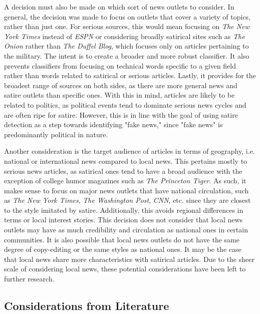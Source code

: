 \documentclass [12 pt] {report}
\begin{document}
A decision must also be made on which sort of news outlets to consider. In general, the decision was made to focus on outlets that cover a variety of topics, rather than just one. For serious sources, this would mean focusing on \textit{The New York Times} instead of \textit{ESPN} or considering broadly satirical sites such as \textit{The Onion} rather than \textit{The Duffel Blog}, which focuses only on articles pertaining to the military. The intent is to create a broader and more robust classifier. It also prevents classifiers from focusing on technical words specific to a given field rather than words related to satirical or serious articles. Lastly, it provides for the broadest range of sources on both sides, as there are more general news and satire outlets than specific ones. With this in mind, articles are likely to be related to politics, as political events tend to dominate serious news cycles and are often ripe for satire. However, this is in line with the goal of using satire detection as a step towards identifying "fake news," since "fake news" is predominantly political in nature.


Another consideration is the target audience of articles in terms of geography, i.e. national or international news compared to local news. This pertains mostly to serious news articles, as satirical ones tend to have a broad audience with the exception of college humor magazines such as \textit{The Princeton Tiger}. As such, it makes sense to focus on major news outlets that have national circulation, such as \textit{The New York Times}, \textit{The Washington Post}, \textit{CNN}, etc. since they are closest to the style imitated by satire. Additionally, this avoids regional differences in terms or local interest stories. This decision does not consider that local news outlets may have as much credibility and circulation as national ones in certain communities. It is also possible that local news outlets do not have the same degree of copy-editing or the same styles as national ones. It may be the case that local news share more characteristics with satirical articles. Due to the sheer scale of considering local news, these potential considerations have been left to further research.

\subsection{Considerations from Literature}
\end{document}
